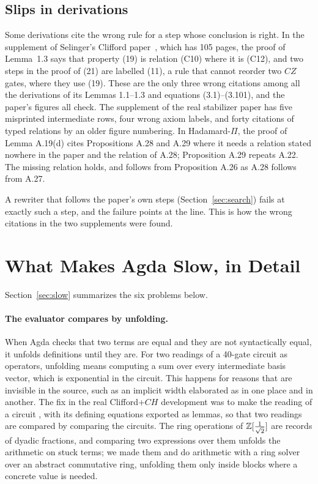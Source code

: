 \subsection{Slips in derivations}\label{sec:slips}

Some derivations cite the wrong rule for a step whose conclusion is
right. In the supplement of Selinger's Clifford
paper~\cite{selinger2015clifford}, which has 105 pages, the proof of
Lemma~1.3 says that property (19) is relation (C10) where it is (C12),
and two steps in the proof of (21) are labelled (11), a rule that cannot
reorder two $CZ$ gates, where they use (19). These are the only three
wrong citations among all the derivations of its Lemmas 1.1--1.3 and
equations (3.1)--(3.101), and the paper's figures all check. The
supplement of the real stabilizer paper has five misprinted
intermediate rows, four wrong axiom labels, and forty citations of
typed relations by an older figure numbering. In Hadamard-$\Pi$, the
proof of Lemma A.19(d) cites Propositions A.28 and A.29 where it needs
a relation stated nowhere in the paper and the relation of A.28;
Proposition A.29 repeats A.22. The missing relation holds, and follows
from Proposition A.26 as A.28 follows from A.27.

A rewriter that follows the paper's own steps (Section~\ref{sec:search})
fails at exactly such a step, and the failure points at the line. This
is how the wrong citations in the two supplements were found.

\section{What Makes Agda Slow, in Detail}\label{sec:appendix-agda}

Section~\ref{sec:slow} summarizes the six problems below.

\paragraph{The evaluator compares by unfolding.} When Agda checks that
two terms are equal and they are not syntactically equal, it unfolds
definitions until they are. For two readings of a 40-gate circuit as
operators, unfolding means computing a sum over every intermediate
basis vector, which is exponential in the circuit. This happens for
reasons that are invisible in the source, such as an implicit width
elaborated as  in one place and  in another. The fix in
the real Clifford+$CH$ development was to make the reading of a circuit
, with its defining equations exported as lemmas, so that
two readings are compared by comparing the circuits. The ring
operations of $\mathbb{Z}[\frac1{\sqrt2}]$ are records of dyadic fractions, and
comparing two expressions over them unfolds the arithmetic on stuck
terms; we made them  and do arithmetic with a ring solver
over an abstract commutative ring, unfolding them only inside
 blocks where a concrete value is needed.

